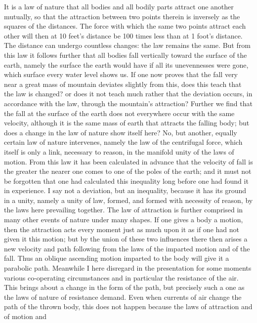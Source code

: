 \documentclass[12pt,a4paper,openany]{book}
\newcommand{\opage}[1]{\marginnote{\footnotesize\textit{[#1]}}}
\begin{document}
It is a law of nature that all bodies and all bodily parts attract one another
mutually, so that the attraction between two points therein is inversely as the
squares of the distances. The force with which the same two points attract each
other will then at 10 feet's distance be 100 times less than at 1 foot's distance.
The distance can undergo countless changes: the law remains the same. But from this
law it follows further that all bodies fall vertically toward the surface of the
earth, namely the surface the earth would have if all its unevennesses were gone,
which surface every water level shows us. If one now proves that the fall very near
a great mass of mountain deviates slightly from this, does this teach that the law
is changed? or does it not teach much rather that the deviation occurs, in
accordance with the law, through the mountain's attraction? Further we find that the
fall at the surface of the earth does not everywhere
\setcounter{footnote}{0}%
\opage{70}occur with the same velocity, although it is the same mass of earth that attracts
the falling body; but does a change in the law of nature show itself here? No, but
another, equally certain law of nature intervenes, namely the law of the centrifugal
force, which itself is only a link, necessary to reason, in the manifold unity of
the laws of motion. From this law it has been calculated in advance that the
velocity of fall is the greater the nearer one comes to one of the poles of the
earth; and it must not be forgotten that one had calculated this inequality long
before one had found it in experience. I say not a deviation, but an inequality,
because it has its ground in a unity, namely a unity of law, formed, and formed with
necessity of reason, by the laws here prevailing together. The law of attraction is
further comprised in many other events of nature under many shapes. If one gives a
body a motion, then the attraction acts every moment just as much upon it as if one
had not given it this motion; but by the union of these two influences there then
arises a new velocity and path following from the laws of the imparted motion and
of the fall. Thus an oblique ascending motion imparted to the body will give it a
parabolic path. Meanwhile I here disregard in the presentation for some moments
various co-operating circumstances and in particular the resistance of the air. This
brings about a change in the form of the path, but precisely such a one as the laws
of nature of resistance demand. Even when currents of air change the path of the
thrown body, this does not happen because the laws of attraction and of motion and
\end{document}
